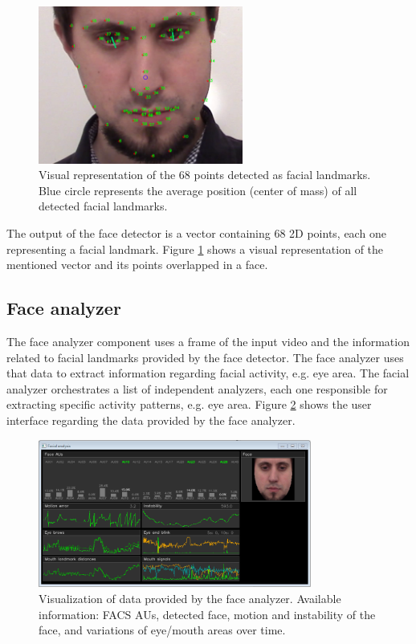 \begin{figure}
    \centering
    \includegraphics[width=0.6\textwidth]{Content/figures/tool-ui-face-detector.png}
    \caption{Visual representation of the 68 points detected as facial landmarks. Blue circle represents the average position (center of mass) of all detected facial landmarks.}
    \label{fig:tool-ui-face-detector}
\end{figure}

The output of the face detector is a vector containing 68 2D points, each one representing a facial landmark. Figure \ref{fig:tool-ui-face-detector} shows a visual representation of the mentioned vector and its points overlapped in a face.

\subsection{Face analyzer}

The face analyzer component uses a frame of the input video and the information related to facial landmarks provided by the face detector. The face analyzer uses that data to extract information regarding facial activity, e.g. eye area. The facial analyzer orchestrates a list of independent analyzers, each one responsible for extracting specific activity patterns, e.g. eye area. Figure \ref{fig:tool-ui-face-analyzer} shows the user interface regarding the data provided by the face analyzer.

\begin{figure}[h]
    \centering
    \includegraphics[width=0.8\textwidth]{Content/figures/tool-ui-face-analyzer.png}
    \caption{Visualization of data provided by the face analyzer. Available information: FACS AUs, detected face, motion and instability of the face, and variations of eye/mouth areas over time.}
    \label{fig:tool-ui-face-analyzer}
\end{figure}

